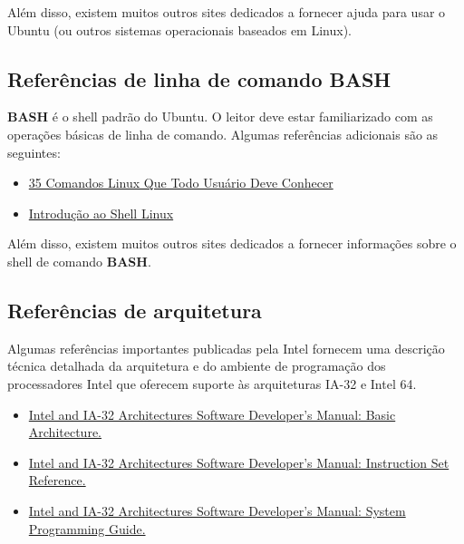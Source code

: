 Além disso, existem muitos outros sites dedicados a fornecer ajuda para usar o Ubuntu (ou outros sistemas operacionais baseados em Linux).

\subsection{Referências de linha de comando BASH}
\textbf{BASH} é o shell padrão do Ubuntu. O leitor deve estar familiarizado com as operações básicas de linha de comando. Algumas referências adicionais são as seguintes:
\begin{itemize}
	\item \href{https://www.hostinger.com.br/tutoriais/comandos-linux}{35 Comandos Linux Que Todo Usuário Deve Conhecer}
	\item \href{http://leg.ufpr.br/~fernandomayer/aulas/ce083/shell-linux.html}{Introdução ao Shell Linux}
\end{itemize}

Além disso, existem muitos outros sites dedicados a fornecer informações sobre o shell de comando \textbf{BASH}.

\subsection{Referências de arquitetura}
Algumas referências importantes publicadas pela Intel fornecem uma descrição técnica detalhada da arquitetura e do ambiente de programação dos processadores Intel que oferecem suporte às arquiteturas IA-32 e Intel 64.
\begin{itemize}
	\item \href{https://www.intel.com/content/dam/www/public/us/en/documents/manuals/64-ia-32-architectures-software-developer-vol-1-manual.pdf}{Intel\textregistered{} and IA-32 Architectures	Software Developer’s Manual: Basic
		Architecture.}
	\item \href{http://www.intel.com/content/dam/www/public/us/en/documents/manuals/64-ia-32-architectures-software-developer-instruction-set-reference-manual-325383.pdf}{Intel\textregistered{} and IA-32 Architectures Software Developer’s Manual: Instruction
		Set Reference.}
	\item  \href{https://www.intel.com/content/dam/www/public/us/en/documents/manuals/64-ia-32-architectures-software-developer-system-programming-manual-325384.pdf}{Intel\textregistered{} and IA-32 Architectures Software Developer’s Manual: System
		Programming Guide.}
\end{itemize}

